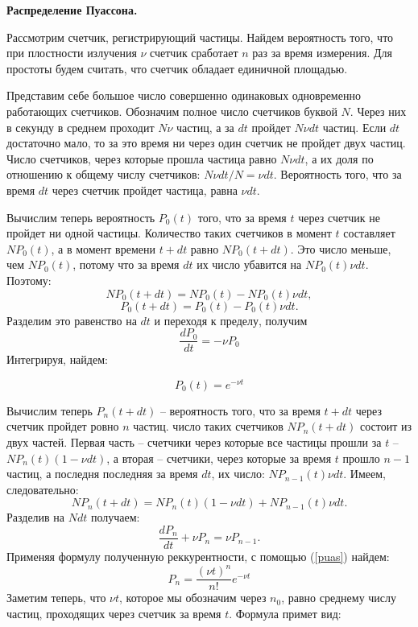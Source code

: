 \documentclass[a4paper, 12pt]{article}
\begin{document}
	\begin{center}
		\textbf{Распределение Пуассона.}
	\end{center}
	Рассмотрим счетчик, регистрирующий частицы. Найдем вероятность того, что при плостности излучения $\nu$ счетчик сработает $n$ раз за время измерения. Для простоты будем считать, что счетчик обладает единичной площадью.
	
	Представим себе большое число совершенно одинаковых одновременно работающих счетчиков. Обозначим полное число счетчиков буквой $N$. Через них в секунду в среднем проходит $N\nu$ частиц, а за $dt$ пройдет $N\nu dt$ частиц. Если $dt$ достаточно мало, то за это время ни через один счетчик не пройдет двух частиц. Число счетчиков, через которые прошла частица равно $N\nu dt$, а их доля по отношению к общему числу счетчиков: $N\nu dt/N = \nu dt$. Вероятность того, что за время $dt$ через счетчик пройдет частица, равна $\nu dt$.
	
	Вычислим теперь вероятность $P_0(t)$ того, что за время $t$ через счетчик не пройдет ни одной частицы. Количество таких счетчиков в момент $t$ составляет $NP_0 (t)$, а в момент времени $t+dt$ равно $NP_0 (t+dt)$. Это число меньше, чем $NP_0 (t)$, потому что за время $dt$ их число убавится на $NP_0 (t)\nu dt$. Поэтому: \[NP_0 (t+dt) = NP_0(t) - NP_0 (t)\nu dt,\] \[P_0 (t+dt) = P_0(t) - P_0 (t)\nu dt.\] Разделим это равенство на $dt$ и переходя к пределу, получим \[ \frac{dP_0}{dt} = -\nu P_0 \]  Интегрируя, найдем: 
	
	\begin{equation}
		P_0 (t) = e^{-\nu t}
		\label{puas}
	\end{equation}
	
	Вычислим теперь $P_n (t+dt)$ -- вероятность того, что за время $t+dt$ через счетчик пройдет ровно $n$ частиц. число таких счетчиков $NP_n(t+dt)$ состоит из двух частей. Первая часть -- счетчики через которые все частицы прошли за $t$ -- $NP_n(t)(1-\nu dt)$, а вторая -- счетчики, через которые за время $t$ прошло $n-1$ частиц, а последня последняя за время $dt$, их число: $NP_{n-1}(t)\nu dt$. Имеем, следовательно: \[NP_n(t+dt) = NP_n(t)(1-\nu dt) + NP_{n-1}(t)\nu dt.\]
	Разделив на $Ndt$ получаем:\[ \frac{dP_n}{dt} + \nu P_n = \nu P_{n-1}. \]
	Применяя формулу полученную реккурентности, с помощью (\ref{puas}) найдем: \[ P_n = \frac{(\nu t)^n}{n!}e^{-\nu t} \] 
	Заметим теперь, что $\nu t $, которое мы обозначим через $n_0$, равно среднему числу частиц, проходящих через счетчик за время $t$. Формула примет вид:
	
\end{document}

